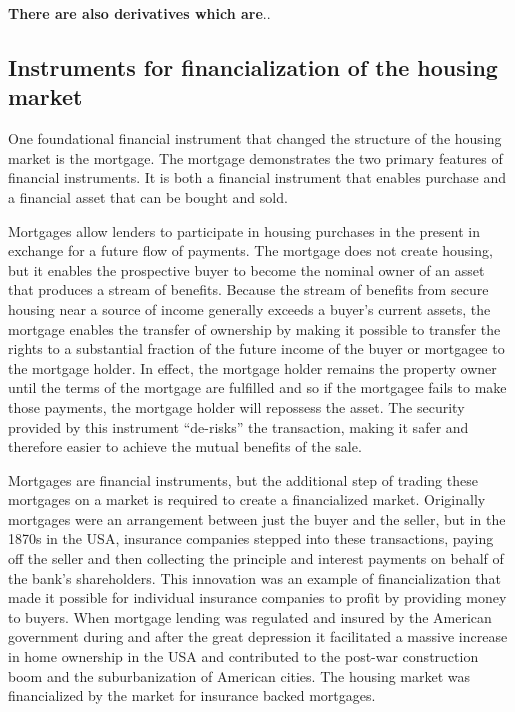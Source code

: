 \textbf{There are also derivatives which are}..     

\subsection{Instruments for financialization of the housing market}

One foundational financial instrument that changed the structure of the housing market is the mortgage. The mortgage demonstrates the two primary features of financial instruments. It is both a financial instrument that enables purchase and a financial asset that can be bought and sold. 

Mortgages allow lenders to participate in housing purchases in the present in exchange for a future flow of payments. The mortgage does not create housing, but it enables the prospective buyer to become the nominal owner of an asset that produces a stream of benefits. Because the stream of benefits from secure housing near a source of income generally exceeds a buyer's current assets, the mortgage enables the transfer of ownership by making it possible to transfer the rights to a substantial fraction of the future income of the buyer or mortgagee to the mortgage holder. In effect, the mortgage holder remains the property owner until the terms of the mortgage are fulfilled and so if the mortgagee fails to make those payments, the mortgage holder will repossess the asset. The security provided by this instrument ``de-risks'' the transaction, making it safer and therefore easier to achieve the mutual benefits of the sale.

Mortgages are financial instruments, but %
the additional step of trading these mortgages on a market is required to create a financialized market. 
Originally mortgages were an arrangement between just the buyer and the seller, but in the 1870s in the USA, insurance companies stepped into these transactions, paying off the seller and then collecting the principle and interest payments on behalf of the bank's shareholders. This innovation was an example of financialization that made it possible for individual insurance companies to profit by providing money to buyers. When mortgage lending was regulated and insured  by the American government during and after the great depression it facilitated a massive increase in home ownership in the USA and contributed to the post-war construction boom and the suburbanization of American cities. The housing market was financialized by the market for insurance backed mortgages.

